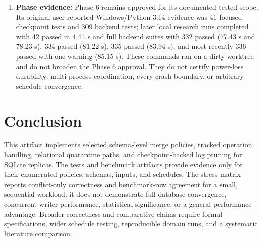 \documentclass[runningheads]{llncs}
\begin{document}
\begin{enumerate}
\item \textbf{Phase evidence:} Phase 6 remains approved for its documented tested scope. Its original user-reported Windows/Python 3.14 evidence was 41 focused checkpoint tests and 309 backend tests; later local research runs completed \texttt{} with 42 passed in 4.41 s and full backend suites with 332 passed (77.43 s and 78.23 s), 334 passed (81.22 s), 335 passed (83.94 s), and most recently 336 passed with one warning (85.15 s). These commands ran on a dirty worktree and do not broaden the Phase 6 approval. They do not certify power-loss durability, multi-process coordination, every crash boundary, or arbitrary-schedule convergence.
\end{enumerate}
\section{Conclusion}
This artifact implements selected schema-level merge policies, tracked operation handling, relational quarantine paths, and checkpoint-backed log pruning for SQLite replicas. The tests and benchmark artifacts provide evidence only for their enumerated policies, schemas, inputs, and schedules. The stress matrix reports conflict-only correctness and benchmark-row agreement for a small, sequential workload; it does not demonstrate full-database convergence, concurrent-writer performance, statistical significance, or a general performance advantage. Broader correctness and comparative claims require formal specifications, wider schedule testing, reproducible domain runs, and a systematic literature comparison.



\end{document}
